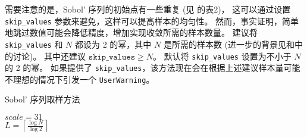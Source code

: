 需要注意的是，Sobol' 序列的初始点有一些重复 (见 的表2)，%
这可以通过设置 \texttt{skip\_values} 参数来避免，这样可以提高样本的均匀性。%
然而，事实证明，简单地跳过数值可能会降低精度，增加实现收敛所需的样本数量\cite{owen2021}。
建议将 \texttt{skip\_values} 和 $N$ 都设为 2 的幂，其中 $N$ 是所需的样本数 (进一步的背景见和中的讨论)。%
其中还建议 $\mathtt{skip\_values} \ge N$。%
默认将 \texttt{skip\_values} 设置为不小于 $N$ 的 2 的幂。%
如果提供了 \texttt{skip\_values}，该方法现在会在根据上述建议样本量可能不理想的情况下引发一个 \texttt{UserWarning}。

\begin{algorithm}
    \caption{Sobol' 序列取样方法}\label{alg:sobol}
    $scale = 31$\\
    $L = \left\lceil \frac{\log N}{\log 2} \right\rceil$\\
\end{algorithm}
